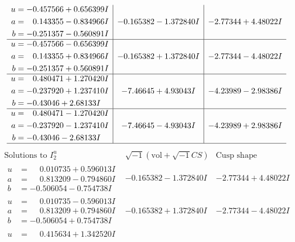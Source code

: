 \documentclass[1p]{elsarticle_modified}
\theoremstyle{definition}
\newcommand{\I}{\sqrt{-1}}
\begin{document}
$$\begin{array}{c|c|c}
\begin{aligned}
u &= -0.457566 + 0.656399 I \\
a &= \phantom{-}0.143355 - 0.834966 I \\
b &= -0.251357 - 0.560891 I\end{aligned}
 & -0.165382 - 1.372840 I & -2.77344 + 4.48022 I \\ \hline\begin{aligned}
u &= -0.457566 - 0.656399 I \\
a &= \phantom{-}0.143355 + 0.834966 I \\
b &= -0.251357 + 0.560891 I\end{aligned}
 & -0.165382 + 1.372840 I & -2.77344 - 4.48022 I \\ \hline\begin{aligned}
u &= \phantom{-}0.480471 + 1.270420 I \\
a &= -0.237920 + 1.237410 I \\
b &= -0.43046 + 2.68133 I\end{aligned}
 & -7.46645 + 4.93043 I & -4.23989 - 2.98386 I \\ \hline\begin{aligned}
u &= \phantom{-}0.480471 - 1.270420 I \\
a &= -0.237920 - 1.237410 I \\
b &= -0.43046 - 2.68133 I\end{aligned}
 & -7.46645 - 4.93043 I & -4.23989 + 2.98386 I\\
 \hline 
 \end{array}$$\newpage$$\begin{array}{c|c|c}  
\text{Solutions to }I^u_{2}& \I (\text{vol} + \sqrt{-1}CS) & \text{Cusp shape}\\
 \hline 
\begin{aligned}
u &= \phantom{-}0.010735 + 0.596013 I \\
a &= \phantom{-}0.813209 - 0.794860 I \\
b &= -0.506054 - 0.754738 I\end{aligned}
 & -0.165382 - 1.372840 I & -2.77344 + 4.48022 I \\ \hline\begin{aligned}
u &= \phantom{-}0.010735 - 0.596013 I \\
a &= \phantom{-}0.813209 + 0.794860 I \\
b &= -0.506054 + 0.754738 I\end{aligned}
 & -0.165382 + 1.372840 I & -2.77344 - 4.48022 I \\ \hline\begin{aligned}
u &= \phantom{-}0.415634 + 1.342520 I \\

\end{aligned}
\end{array}$$
\end{document}

